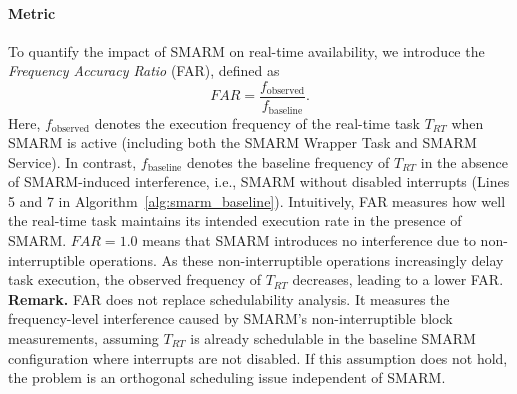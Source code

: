 \documentclass{ieeeaccess}
\begin{document}
\paragraph{\textbf{Metric}}
To quantify the impact of SMARM on real-time availability, we 
introduce the \emph{Frequency Accuracy Ratio} (FAR), defined as
\begin{equation}
    FAR = \frac{f_{\text{observed}}}{f_{\text{baseline}}}.
\end{equation}
Here, $f_{\text{observed}}$ denotes the execution frequency of 
the real-time task $T_{RT}$ when SMARM is active (including both 
the SMARM Wrapper Task and SMARM Service).
In contrast, $f_{\text{baseline}}$ denotes the baseline frequency 
of $T_{RT}$ in the absence of SMARM-induced interference, i.e., 
SMARM without disabled interrupts (Lines 5 and 7 in 
Algorithm~\ref{alg:smarm_baseline}).
Intuitively, FAR measures how well the real-time task maintains 
its intended execution rate in the presence of SMARM.
$FAR = 1.0$ means that SMARM introduces no interference due to 
non-interruptible operations.
As these non-interruptible operations increasingly delay task 
execution, the observed frequency of $T_{RT}$ decreases, leading to a lower FAR.~\\


\noindent\textbf{Remark.}
FAR does not replace schedulability analysis.
It measures the frequency-level interference caused by SMARM's non-interruptible block measurements, assuming $T_{RT}$ is already schedulable in the baseline SMARM configuration where interrupts are not disabled.
If this assumption does not hold, the problem is an orthogonal scheduling issue independent of SMARM.
\end{document}

